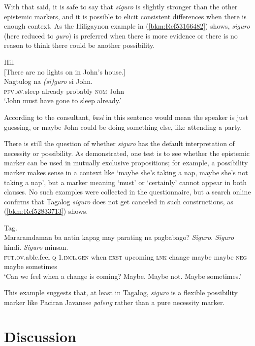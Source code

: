 \documentclass[output=paper,colorlinks,citecolor=brown]{langscibook}
\begin{document}
With that said, it is safe to say that \textit{siguro} is slightly stronger than the other epistemic markers, and it is possible to elicit consistent differences when there is enough context. As the Hiligaynon example in (\ref{bkm:Ref53166482}) shows, \textit{siguro} (here reduced to \textit{guro}) is preferred when there is more evidence or there is no reason to think there could be another possibility.

\ea
{\label{bkm:Ref53166482}Hil.}\\{}
 [There are no lights on in John’s house.]\\
\gll Nagtulog na \textit{(si)guro} si John.\\
    \textsc{pfv.av.}sleep already probably \textsc{nom} John\\
\glt `John must have gone to sleep already.'
\z

According to the consultant, \textit{basi} in this sentence would mean the speaker is just guessing, or maybe John could be doing something else, like attending a party. 

There is still the question of whether \textit{siguro} has the default interpretation of necessity or possibility. As \citet[345]{VanderKlok2013} demonstrated, one test is to see whether the epistemic marker can be used in mutually exclusive propositions; for example, a possibility marker makes sense in a context like ‘maybe she's taking a nap, maybe she's not taking a nap’, but a marker meaning ‘must’ or ‘certainly’ cannot appear in both clauses. No such examples were collected in the questionnaire, but a search online confirms that Tagalog \textit{siguro} does not get canceled in such constructions, as (\ref{bkm:Ref52833713}) shows. 

\ea
{\label{bkm:Ref52833713}Tag.}\\
\gll Mararamdaman ba natin kapag may parating na pagbabago? \textit{Siguro}. \textit{Siguro} hindi. \textit{Siguro} minsan.\\
    \textsc{fut.ov}.able.feel \textsc{q} 1.\textsc{incl.gen} when \textsc{exst} upcoming \textsc{lnk} change   maybe maybe \textsc{neg} maybe sometimes\\
\glt ‘Can we feel when a change is coming? Maybe. Maybe not. Maybe sometimes.’ \citep{Yatchi2012}
\z

This example suggests that, at least in Tagalog, \textit{siguro} is a flexible possibility marker like Paciran Javanese \textit{paleng} rather than a pure necessity marker.

\section{Discussion}
\end{document}
